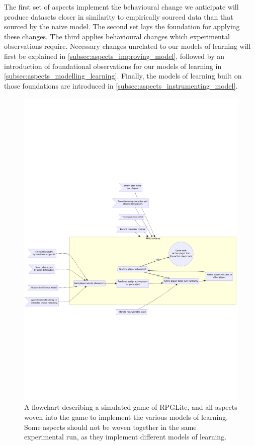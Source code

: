 The first set of aspects implement the behavioural change we anticipate will
produce datasets closer in similarity to empirically sourced data than that
sourced by the naive model. The second set lays the foundation for applying
these changes. The third applies behavioural changes which experimental
observations require. Necessary changes unrelated to our models of learning will
first be explained in \cref{subsec:aspects_improving_model}, followed by an
introduction of foundational observations for our models of learning in
\cref{subsec:aspects_modelling_learning}. Finally, the models of learning built
on those foundations are introduced in
\cref{subsec:aspects_instrumenting_model}.

\begin{figure}
  \centering
  \includegraphics[width=\columnwidth]{50_optimisation_with_aspects/diagrams/aspect_applied_model.png}
  \caption{A flowchart describing a simulated game of RPGLite, and all aspects woven into the game to implement the various models of learning. Some aspects should not be woven together in the same experimental run, as they implement different models of learning.}
  \label{fig:all_aspects_applied}
\end{figure}

